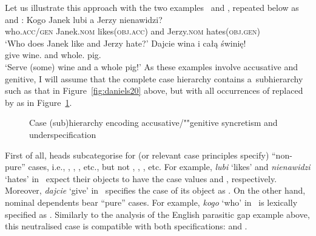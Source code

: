 \documentclass[output=paper
                ,modfonts
                ,nonflat
	        ,collection
	        ,collectionchapter
	        ,collectiontoclongg
 	        ,biblatex
                ,babelshorthands
                ,newtxmath
                ,draftmode
                ,colorlinks, citecolor=brown
]{./langsci/langscibook}
\begin{document}
\begin{exe}
\begin{xlist}
\begin{exe}
\begin{xlist}
Let us illustrate this approach with the two  examples~ and
, repeated below as  and :
\eal
\ex
\label{ex:syn:pc:again} 
\gll Kogo Janek lubi a Jerzy nienawidzi? \\
     who.\textsc{acc/gen} Janek.\textsc{nom} likes(\textsc{obj.acc}) and Jerzy.\textsc{nom} hates(\textsc{obj.gen})\hspace{-6pt}\\
\glt  `Who does Janek like and Jerzy hate?’
\ex\label{ex:dis:pl:again}
\gll Dajcie wina i całą świnię! \\
    give wine.\GEN{} and whole.\ACC{} pig.\ACC{}\\
\glt `Serve (some) wine and a whole pig!’
\zl
As these examples involve accusative and genitive, I will assume that the complete case hierarchy
contains a~subhierarchy such as that in Figure~\ref{fig:daniels20} above, but with all occurrences of
 replaced by  as in Figure~\ref{fig:case4}.
\begin{figure}
\caption{Case (sub)hierarchy encoding accusative/""genitive syncretism and underspecification}\label{fig:case4}
\end{figure}


First of all, heads subcategorise for (or relevant case principles specify) “non-pure” cases, i.e., , , , etc., but not , , , etc.  For example, \emph{lubi} `likes’ and \emph{nienawidzi} `hates’ in~ expect their objects to have the case values  and , respectively.  Moreover, \emph{dajcie} `give’ in~ specifies the case of its object as .  On the other hand, nominal dependents bear “pure” cases.  For example, \emph{kogo} `who’ in~ is lexically specified as .  Similarly to the analysis of the English parasitic gap example above, this neutralised case is compatible with both specifications:  and .


\end{xlist}
\end{exe}
\end{xlist}
\end{exe}
\end{document}
